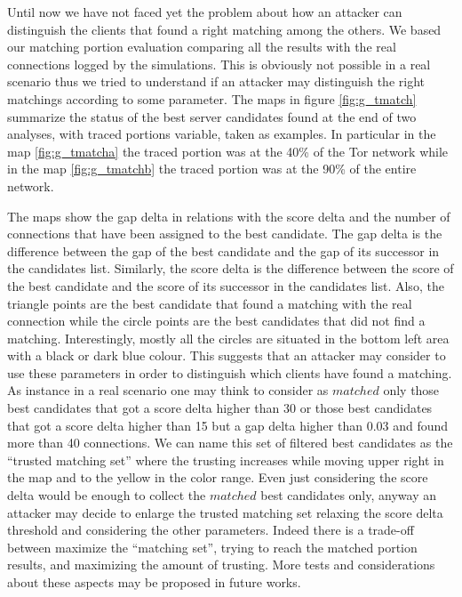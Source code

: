 Until now we have not faced yet the problem about how an attacker can distinguish
the clients that found a right matching among the others. We based our
matching portion evaluation comparing all the results with the real
connections logged by the simulations. This is obviously not possible
in a real scenario thus we tried to understand if an attacker may
distinguish the right matchings according to some parameter.
The maps in figure \ref{fig:g_tmatch} summarize the status of the best
server candidates found at the end of two analyses, with traced portions
variable, taken as
examples. In particular in the map \ref{fig:g_tmatcha} the traced
portion was at the 40\% of the Tor network while in the map
\ref{fig:g_tmatchb} the traced portion was at the 90\% of the entire
network. 

The maps show the gap delta in
relations with the score delta and the number of
connections that have been assigned to the best candidate. 
The gap delta is the difference between the gap of the best candidate
and the gap of its successor in the candidates list.
Similarly, the score delta is the difference between the score of the
best candidate and the score of its successor in the candidates list.
Also, the triangle points are the best candidate that found a matching
with the real connection while the circle points are the 
best candidates that did not find a matching.
Interestingly, mostly all the circles are situated in the bottom left
area with a black or dark blue colour. This suggests that an attacker
may consider to use these parameters in order to distinguish which
clients have found a matching. As instance in a real scenario one may
think to consider as $matched$ only those best candidates that got a
score delta higher than 30 or those best candidates that got a score
delta higher than 15 but a gap delta higher than 0.03 and found more
than 40 connections. We can name this set of filtered best candidates as
the ``trusted matching set'' where the trusting increases while moving
upper right in the map and to the yellow in the color range. Even just
considering the score delta would be enough to collect the
$matched$ best candidates only, anyway an attacker may decide to enlarge
the trusted matching set relaxing the score delta threshold and
considering the other parameters. Indeed there is a trade-off between
maximize the ``matching set'', trying to reach the matched portion
results, and maximizing the amount of
trusting. More tests and considerations about these aspects may be
proposed in future works.
